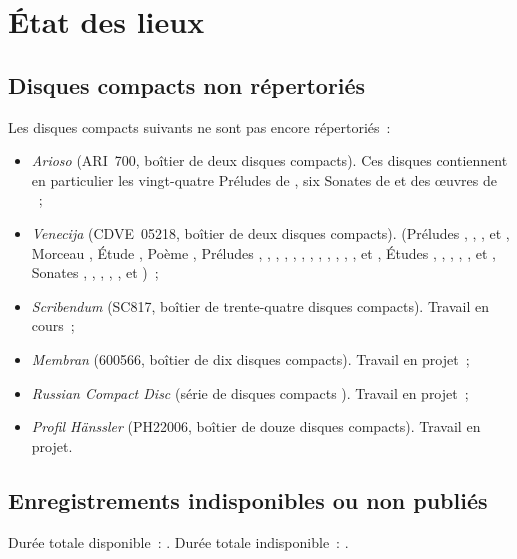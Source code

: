 \chapter[%
État des lieux][%
État des lieux]{%
État des lieux}
\label{chap:Etat-des-lieux}

\section{Disques compacts non répertoriés}
\label{sec:Nonrepertorie}

Les disques compacts suivants ne sont pas encore répertoriés~:
\begin{itemize}
 \item
 \emph{Arioso} (ARI~700, boîtier de deux disques compacts).
 Ces disques contiennent en particulier les vingt-quatre Préludes 
 de \Chopin{}, six Sonates de \Scriabine{} et des œuvres de \Liadov{}~;
 \item
 \emph{Venecija} (CDVE~05218, boîtier de deux disques compacts).
 \Scriabine{} (Préludes  ,  ,
  ,   et  ,
 Morceau  , Étude  , Poème 
 , Préludes  ,  , 
 ,  ,  , 
 ,  ,  , 
 ,  ,  , 
 ,   et  , Études
  ,  ,  , 
 ,  ,   et 
 , Sonates , , , , ,
  et )~;
 \item
 \emph{Scribendum} (SC817, boîtier de trente-quatre disques compacts).
 Travail en cours~;
 \item
 \emph{Membran} (600566, boîtier de dix disques compacts).
 Travail en projet~;
 \item
 \emph{Russian Compact Disc} (série de disques compacts ).
 Travail en projet~;
 \item
 \emph{Profil Hänssler} (PH22006, boîtier de douze disques compacts).
 Travail en projet.
\end{itemize}

\section{Enregistrements indisponibles ou non publiés}
\label{sec:IndisponibleNonpublie}

Durée totale disponible~: \availabletotaltime.
Durée totale indisponible~: \unavailabletotaltime.
